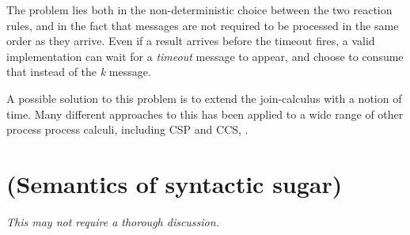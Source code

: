 The problem lies both in the non-deterministic choice between the two reaction
rules, and in the fact that messages are not required to be processed in the
same order as they arrive. Even if a result arrives before the timeout fires, a
valid implementation can wait for a \emph{timeout} message to appear, and
choose to consume that instead of the \emph{k} message.

A possible solution to this problem is to extend the join-calculus with a
notion of time. Many different approaches to this has been applied to a wide
range of other process process calculi, including CSP and CCS,
\citep{nicollin-overview}. \citep{timed-join}

\section{(Semantics of syntactic sugar)}

\emph{This may not require a thorough discussion.}
